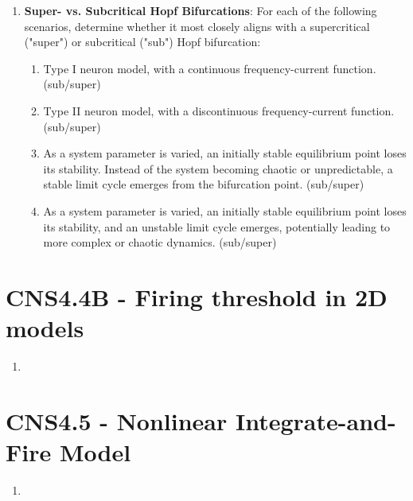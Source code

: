 \documentclass[11pt,letterpaper]{article}
\begin{document}
\begin{enumerate}
    \item \textbf{Super- vs. Subcritical Hopf Bifurcations}: For each of the following scenarios, determine whether it most closely aligns with a supercritical ("super") or subcritical ("sub") Hopf bifurcation:
    \begin{enumerate}
        \item Type I neuron model, with a continuous frequency-current function. (sub/super)
        \item Type II neuron model, with a discontinuous frequency-current function. (sub/super)
        \item As a system parameter is varied, an initially stable equilibrium point loses its stability. Instead of the system becoming chaotic or unpredictable, a stable limit cycle emerges from the bifurcation point. (sub/super)
        \item As a system parameter is varied, an initially stable equilibrium point loses its stability, and an unstable limit cycle emerges, potentially leading to more complex or chaotic dynamics. (sub/super)
    \end{enumerate}
    

\end{enumerate}
\pagebreak

\section{CNS4.4B - Firing threshold in 2D models}
\begin{enumerate}
    \item 
\end{enumerate}
\pagebreak

\section{CNS4.5 - Nonlinear Integrate-and-Fire Model}
\begin{enumerate}
    \item 
\end{enumerate}
\pagebreak
\end{document}
